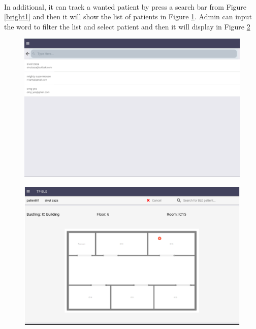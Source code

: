 \newpage
\paragraph{}In additional, it can track a wanted patient by press a search bar from Figure \ref{bright1} and then it will show the list of patients in Figure \ref{bright2}. Admin can input the word to filter the list and select patient and then it will display in Figure \ref{bright3}

\begin{figure}[h]
\centering
\includegraphics[width=\textwidth]{Image/bright2.png}
\caption{}
\label{bright2}
\end{figure}

\begin{figure}[h]
\centering
\includegraphics[width=\textwidth]{Image/bright3.png}
\caption{}
\label{bright3}
\end{figure}

